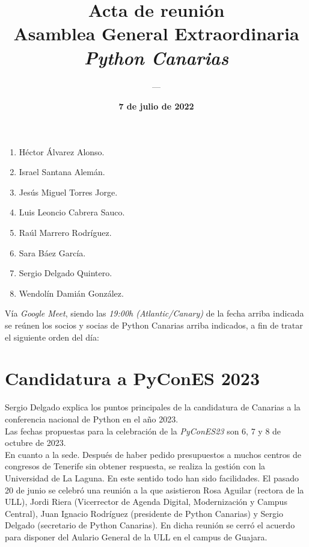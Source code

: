 \documentclass[a4paper,12pt]{article}
\title{\huge \textbf{Acta de reunión} \\ Asamblea General Extraordinaria \\ \textit{Python Canarias}}
\date{\textbf{7 de julio de 2022}}
\author{---}
\begin{document}
\renewcommand{\contentsname}{Orden del día}

\maketitle

\begin{enumerate}
    \item Héctor Álvarez Alonso.
    \item Israel Santana Alemán.
    \item Jesús Miguel Torres Jorge.
    \item Luis Leoncio Cabrera Sauco.
    \item Raúl Marrero Rodríguez.
    \item Sara Báez García.
    \item Sergio Delgado Quintero.
    \item Wendolín Damián González.
\end{enumerate}

Vía \textit{Google Meet}, siendo las \textit{19:00h (Atlantic/Canary)} de la fecha arriba indicada se reúnen los socios y socias de Python Canarias arriba indicados, a fin de tratar el siguiente orden del día:

\tableofcontents

\section{Candidatura a PyConES 2023}

Sergio Delgado explica los puntos principales de la candidatura de Canarias a la conferencia nacional de Python en el año 2023.\\

Las fechas propuestas para la celebración de la \textit{PyConES23} son 6, 7 y 8 de octubre de 2023.\\

En cuanto a la sede. Después de haber pedido presupuestos a muchos centros de congresos de Tenerife sin obtener respuesta, se realiza la gestión con la Universidad de La Laguna. En este sentido todo han sido facilidades. El pasado 20 de junio se celebró una reunión a la que asistieron Rosa Aguilar (rectora de la ULL), Jordi Riera (Vicerrector de Agenda Digital, Modernización y Campus Central), Juan Ignacio Rodríguez (presidente de Python Canarias) y Sergio Delgado (secretario de Python Canarias). En dicha reunión se cerró el acuerdo para disponer del Aulario General de la ULL en el campus de Guajara.\\
\end{document}
